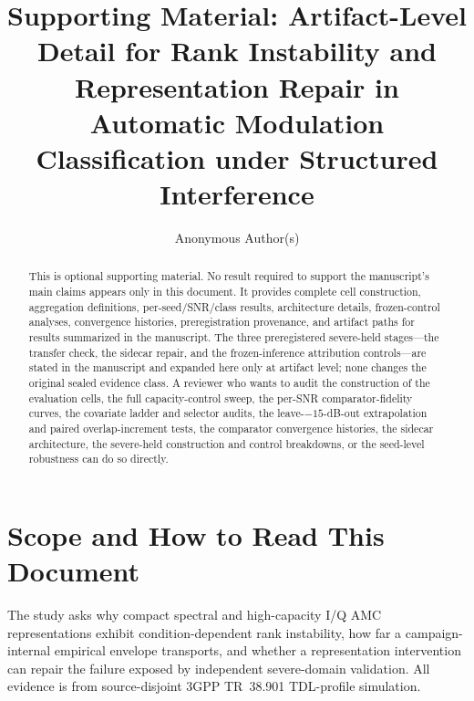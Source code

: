 \documentclass[letterpaper,onecolumn,11pt,journal]{IEEEtran}
\title{Supporting Material: Artifact-Level Detail for Rank Instability and
Representation Repair in Automatic Modulation Classification under Structured
Interference}
\author{Anonymous Author(s)}
\begin{document}
\maketitle

\begin{abstract}
This is optional supporting material. No result required to support the
manuscript's main claims appears only in this document. It provides complete
cell construction, aggregation definitions, per-seed/SNR/class results,
architecture details, frozen-control analyses, convergence histories,
preregistration provenance, and artifact paths for results summarized in the
manuscript. The three preregistered severe-held stages---the transfer check,
the sidecar repair, and the frozen-inference attribution controls---are
stated in the manuscript and expanded here only at artifact level; none
changes the original sealed evidence class. A reviewer who wants to audit the
construction of the evaluation cells, the full capacity-control sweep, the
per-SNR comparator-fidelity curves, the covariate ladder and selector audits,
the leave-$-15$-dB-out extrapolation and paired overlap-increment tests, the
comparator convergence histories, the sidecar architecture, the severe-held
construction and control breakdowns, or the seed-level robustness can do so
directly.
\end{abstract}

\section{Scope and How to Read This Document}
The study asks why compact spectral and high-capacity I/Q AMC representations
exhibit condition-dependent rank instability, how far a campaign-internal
empirical envelope transports, and whether a representation intervention can
repair the failure exposed by independent severe-domain validation. All
evidence is from source-disjoint 3GPP TR~38.901 TDL-profile simulation.
\end{document}
